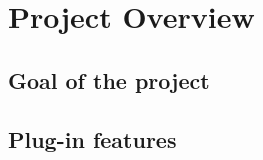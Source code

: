 \section{Project Overview}
\label{PO}

\subsection{Goal of the project}
\label{PO_goal}

\subsection{Plug-in features}
\label{PO_features}